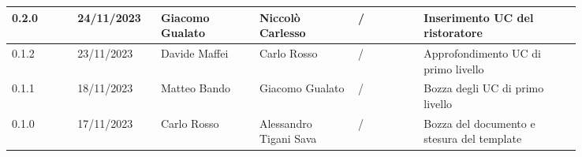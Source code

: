 {\begin{longtable}{p{0.10\linewidth}p{0.10\linewidth}p{0.15\linewidth}p{0.15\linewidth}p{0.10\linewidth}p{0.24\linewidth}}
	  \hline
	  0.2.0             & 24/11/2023    & Giacomo Gualato        & Niccolò Carlesso       & /                      & Inserimento UC del ristoratore                                           \\
	  \hline
	  0.1.2             & 23/11/2023    & Davide Maffei          & Carlo Rosso            & /                      & Approfondimento UC di primo livello                                      \\
	  \hline
	  0.1.1             & 18/11/2023    & Matteo Bando           & Giacomo Gualato        & /                      & Bozza degli UC di primo livello                                          \\
	  \hline
	  0.1.0             & 17/11/2023    & Carlo Rosso            & Alessandro Tigani Sava & /                      & Bozza del documento e stesura del template                               \\
  \end{longtable}
 }
